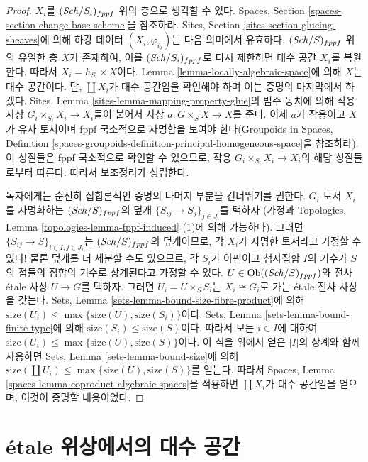 \begin{proof}
$X_i$를 $(\mathit{Sch}/S_i)_{fppf}$ 위의 층으로 생각할 수 있다.
Spaces, Section \ref{spaces-section-change-base-scheme}을 참조하라.
Sites, Section \ref{sites-section-glueing-sheaves}에 의해
하강 데이터 $(X_i, \varphi_{ij})$는 다음 의미에서 유효하다.
$(\mathit{Sch}/S)_{fppf}$ 위의 유일한 층 $X$가 존재하여,
이를 $(\mathit{Sch}/S_i)_{fppf}$로 다시 제한하면 대수 공간 $X_i$를 복원한다.
따라서 $X_i = h_{S_i} \times X$이다.
Lemma \ref{lemma-locally-algebraic-space}에 의해 $X$는 대수 공간이다.
단, $\coprod X_i$가 대수 공간임을 확인해야 하며 이는 증명의
마지막에서 하겠다.
Sites, Lemma \ref{sites-lemma-mapping-property-glue}의 범주 동치에 의해
작용 사상 $G_i \times_{S_i} X_i \to X_i$들이 붙어서
사상 $a : G \times_S X \to X$를 준다.
이제 $a$가 작용이고 $X$가 유사 토서이며 fppf 국소적으로
자명함을 보여야 한다(Groupoids in Spaces, Definition
\ref{spaces-groupoids-definition-principal-homogeneous-space}을 참조하라).
이 성질들은 fppf 국소적으로 확인할 수 있으므로,
작용 $G_i \times_{S_i} X_i \to X_i$의 해당 성질들로부터 따른다.
따라서 보조정리가 성립한다.

\medskip\noindent
독자에게는 순전히 집합론적인 증명의 나머지 부분을 건너뛰기를 권한다.
$G_i$-토서 $X_i$를 자명화하는
$(\mathit{Sch}/S)_{fppf}$의 덮개
$\{S_{ij} \to S_j\}_{j \in J_i}$를 택하자
(가정과 Topologies, Lemma
\ref{topologies-lemma-fppf-induced} (1)에 의해 가능하다).
그러면 $\{S_{ij} \to S\}_{i \in I, j \in J_i}$는
$(\mathit{Sch}/S)_{fppf}$의 덮개이므로, 각 $X_i$가 자명한 토서라고
가정할 수 있다! 물론 덮개를 더 세분할 수도 있으므로,
각 $S_i$가 아핀이고 첨자집합 $I$의 기수가 $S$의 점들의 집합의
기수로 상계된다고 가정할 수 있다.
$U \in \mathop{\mathrm{Ob}}\nolimits((\mathit{Sch}/S)_{fppf})$와 전사 \'etale 사상 $U \to G$를
택하자. 그러면 $U_i = U \times_S S_i$는
$X_i \cong G_i$로 가는 \'etale 전사 사상을 갖는다.
Sets, Lemma \ref{sets-lemma-bound-size-fibre-product}에 의해
$\text{size}(U_i) \leq \max\{\text{size}(U), \text{size}(S_i)\}$이다.
Sets, Lemma \ref{sets-lemma-bound-finite-type}에 의해
$\text{size}(S_i) \leq \text{size}(S)$이다.
따라서 모든 $i \in I$에 대하여
$\text{size}(U_i) \leq \max\{\text{size}(U), \text{size}(S)\}$이다.
이 식을 위에서 얻은 $|I|$의 상계와 함께 사용하면
Sets, Lemma \ref{sets-lemma-bound-size}에 의해
$\text{size}(\coprod U_i) \leq \max\{\text{size}(U), \text{size}(S)\}$를
얻는다. 따라서 Spaces, Lemma
\ref{spaces-lemma-coproduct-algebraic-spaces}을 적용하면
$\coprod X_i$가 대수 공간임을 얻으며, 이것이 증명할 내용이었다.
\end{proof}

\section{\'etale 위상에서의 대수 공간}
\label{section-spaces-etale}

